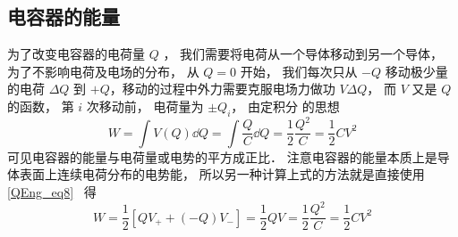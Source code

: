 \subsection{电容器的能量}
为了改变电容器的电荷量 $Q$ ， 我们需要将电荷从一个导体移动到另一个导体， 为了不影响电荷及电场的分布， 从 $Q = 0$ 开始， 我们每次只从 $-Q$ 移动极少量的电荷 $\Delta Q$ 到 $+Q$，移动的过程中外力需要克服电场力做功 $V\Delta Q$， 而 $V$ 又是 $Q$ 的函数， 第 $i$ 次移动前， 电荷量为 $\pm Q_i$， 由定积分 的思想
\begin{equation}
W = \int V(Q) \dd{Q} = \int \frac{Q}{C} \dd{Q} = \frac12 \frac{Q^2}{C} = \frac12 CV^2
\end{equation}
可见电容器的能量与电荷量或电势的平方成正比． 注意电容器的能量本质上是导体表面上连续电荷分布的电势能， 所以另一种计算上式的方法就是直接使用\autoref{QEng_eq8}~ 得
\begin{equation}
W = \frac12 [QV_+ + (-Q)V_-] = \frac12 QV = \frac12 \frac{Q^2}{C} = \frac12 CV^2 
\end{equation}
